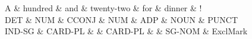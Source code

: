 \begin{dependency}
\begin{deptext}
A \& hundred \& and \& twenty-two \& for \& dinner \& ! \\
DET \& NUM \& CCONJ \& NUM \& ADP \& NOUN \& PUNCT \\
IND-SG \& CARD-PL \&  \& CARD-PL \&  \& SG-NOM \& ExclMark \\
\end{deptext}



\end{dependency}
